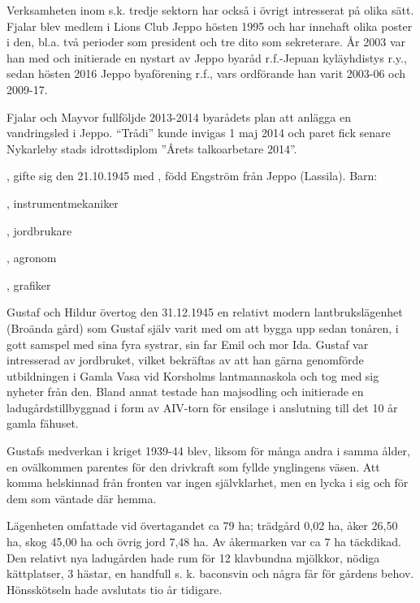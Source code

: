 Verksamheten inom s.k. tredje sektorn har också i övrigt intresserat på olika sätt. Fjalar blev medlem i Lions Club Jeppo hösten 1995 och har innehaft olika poster i den, bl.a. två perioder som president och tre dito som sekreterare. År 2003 var han med och initierade en nystart av Jeppo byaråd r.f.-Jepuan kyläyhdistys r.y., sedan hösten 2016 Jeppo byaförening r.f., vars ordförande han varit 2003-06 och 2009-17.

Fjalar och Mayvor fullföljde 2013-2014 byarådets plan att anlägga en vandringsled i Jeppo. ``Trådi'' kunde invigas 1 maj 2014 och paret fick senare Nykarleby stads idrottsdiplom ”Årets talkoarbetare 2014”.




, gifte sig den 21.10.1945 med , född Engström från Jeppo (Lassila).
Barn:
\begin{jhchildren}
  \item {}, instrumentmekaniker
  \item {}, jordbrukare
  \item {}, agronom
  \item {}, grafiker
\end{jhchildren}

Gustaf och Hildur övertog den 31.12.1945 en relativt modern lantbrukslägenhet (Broända gård) som Gustaf själv varit med om att bygga upp sedan tonåren, i gott samspel med sina fyra systrar, sin far Emil och mor Ida. Gustaf var intresserad av jordbruket, vilket bekräftas av att han gärna genomförde utbildningen i Gamla Vasa vid Korsholms lantmannaskola och tog med sig nyheter från den. Bland annat testade han majsodling och initierade en ladugårdstillbyggnad i form av AIV-torn för ensilage i anslutning till det 10 år gamla fähuset.

Gustafs medverkan i kriget 1939-44 blev, liksom för många andra i samma ålder, en ovälkommen parentes för den drivkraft som fyllde ynglingens väsen. Att komma helskinnad från fronten var ingen självklarhet, men en lycka i sig och för dem som väntade där hemma.

Lägenheten omfattade vid övertagandet ca 79 ha; trädgård 0,02 ha, åker 26,50 ha, skog 45,00 ha och övrig jord 7,48 ha. Av åkermarken var ca 7 ha täckdikad. Den relativt nya ladugården hade rum för 12 klavbundna mjölkkor, nödiga kättplatser, 3 hästar, en handfull s. k. baconsvin och några får för gårdens behov. Hönsskötseln hade avslutats tio år tidigare.

